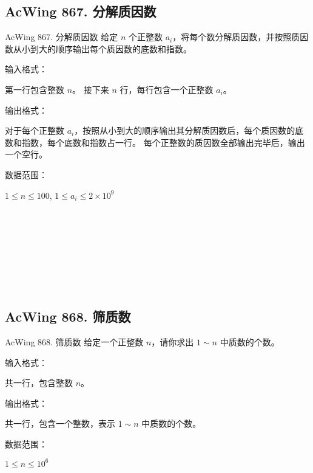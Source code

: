 \subsection{AcWing 867. 分解质因数}
\begin{titledbox}{AcWing 867. 分解质因数}
    给定 $n$ 个正整数 $a_i$，将每个数分解质因数，并按照质因数从小到大的顺序输出每个质因数的底数和指数。

    输入格式：

    第一行包含整数 $n$。 接下来 $n$ 行，每行包含一个正整数 $a_i$。

    输出格式：

    对于每个正整数 $a_i$，按照从小到大的顺序输出其分解质因数后，每个质因数的底数和指数，每个底数和指数占一行。 每个正整数的质因数全部输出完毕后，输出一个空行。

    数据范围：

    $1 \le n \le 100$, $1 \le a_i \le 2 \times 10^9$

    \begin{inputblock}
         \\
         \\
    \end{inputblock}
    \begin{outputblock}
         \\
         \\
        \\
         \\

    \end{outputblock}
\end{titledbox}

\subsection{AcWing 868. 筛质数}
\begin{titledbox}{AcWing 868. 筛质数}
    给定一个正整数 $n$，请你求出 $1 \sim n$ 中质数的个数。

    输入格式：

    共一行，包含整数 $n$。

    输出格式：

    共一行，包含一个整数，表示 $1 \sim n$ 中质数的个数。

    数据范围：

    $1 \le n \le 10^6$

    \begin{inputblock}
    \end{inputblock}
    \begin{outputblock}
    \end{outputblock}
\end{titledbox}


